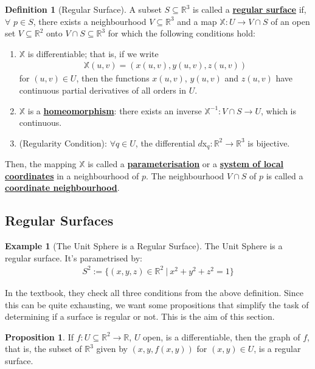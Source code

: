 \documentclass[11pt]{scrartcl}
\newcommand{\R}[0]{\mathbb{R}}
\theoremstyle{definition}
\newtheorem{definition}{Definition}
\newtheorem{prop}{Proposition}
\newtheorem{ex}{Example}
\theoremstyle{remark}
\newcommand{\dfn}[1]{\textbf{\underline{#1}}}
\begin{document}
\begin{definition}[Regular Surface]
	A subset $S \subseteq \R^3$ is called a \dfn{regular surface} if, $\forall$ $p \in S$, there exists a neighbourhood $V \subseteq \R^3$ and a map $\mathbb{X}: U \rightarrow V \cap S$ of an open set $V \subseteq \R^2$ onto $V \cap S \subseteq \R^3$ for which the following conditions hold: 
	\begin{enumerate}[noitemsep]
		\item $\mathbb{X}$ is differentiable; that is, if we write 
		\begin{align*}
			\mathbb{X}(u,v) = (x(u,v), y(u,v), z(u,v)) 
		\end{align*} 
		for $(u,v) \in U$, then the functions $x(u,v)$, $y(u,v)$ and $z(u,v)$ have continuous partial derivatives of all orders in $U$. 
		\item $\mathbb{X}$ is a \dfn{homeomorphism}: there exists an inverse $\mathbb{X}^{-1}: V \cap S \rightarrow U$, which is continuous. 
		\item (Regularity Condition): $\forall q \in U$, the differential $d$x$_q: \R^2 \rightarrow \R^3$ is bijective. 
	\end{enumerate}
	Then, the mapping $\mathbb{X}$ is called a \dfn{parameterisation}  or a \dfn{system of local coordinates} in a neighbourhood of $p$. The neighbourhood $V \cap S$ of $p$ is called a \dfn{coordinate neighbourhood}. 
\end{definition}


\subsection{Regular Surfaces}
\begin{ex}[The Unit Sphere is a Regular Surface] 
	The Unit Sphere is a regular surface. It's parametrised by: 
	\begin{align*}
		S^2 := \{ (x,y,z) \in \R^2\ |\ x^2 + y^2 + z^2 = 1 \} 
	\end{align*}
\end{ex}
In the textbook, they check all three conditions from the above definition. Since this can be quite exhausting, we want some propositions that simplify the task of determining if a surface is regular or not. This is the aim of this section. 

\begin{prop}
	If $f: U \subseteq \R^2 \rightarrow \R$, $U$ open, is a differentiable, then the graph of $f$, that is, the subset of $\R^3$ given by $(x,y, f(x,y))$ for $(x,y) \in U$, is a regular surface. 
\end{prop}
\end{document}
